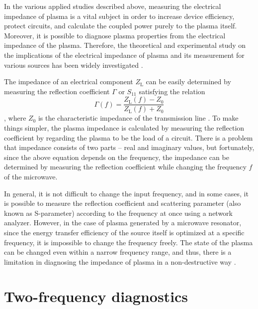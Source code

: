 In the various applied studies described above, measuring the electrical impedance of plasma is a vital subject in order to increase device efficiency, protect circuits, and calculate the coupled power purely to the plasma itself. Moreover, it is possible to diagnose plasma properties from the electrical impedance of the plasma. Therefore, the theoretical and experimental study on the implications of the electrical impedance of plasma and its measurement for various sources has been widely investigated \cite{lieberman2005principles, blackwell2005measurement, iza2005split, choi2009microwave, mckay2010excitation}.

The impedance of an electrical component $Z_\text{L}$ can be easily determined by measuring the reflection coefficient $\Gamma$ or  $S_\text{11}$ satisfying the relation
\begin{equation}
\Gamma \left( f \right) = \frac{Z_\text{L} \left( f \right) - Z_0}{Z_\text{L} \left( f \right) + Z_0}
\end{equation}
, where $Z_0$ is the characteristic impedance of the transmission line \cite{pozar2011microwave}. To make things simpler, the plasma impedance is calculated by measuring the reflection coefficient by regarding the plasma to be the load of a circuit. There is a problem that impedance consists of two parts -- real and imaginary values, but fortunately, since the above equation depends on the frequency, the impedance can be determined by measuring the reflection coefficient while changing the frequency $f$ of the microwave.

In general, it is not difficult to change the input frequency, and in some cases, it is possible to measure the reflection coefficient and scattering parameter (also known as S-parameter) according to the frequency at once using a network analyzer. However, in the case of plasma generated by a microwave resonator, since the energy transfer efficiency of the source itself is optimized at a specific frequency, it is impossible to change the frequency freely. The state of the plasma can be changed even within a narrow frequency range, and thus, there is a limitation in diagnosing the impedance of plasma in a non-destructive way \cite{iza2005split, choi2009microwave, park2010inactivation, kang2011slit, lee2015self}.

\section{Two-frequency diagnostics}
\label{sec:ap7-2}

